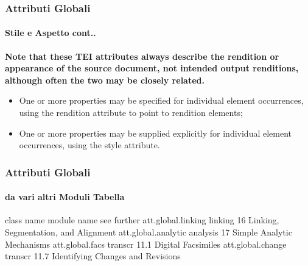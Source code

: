 \begin{frame}
    \frametitle{Attributi Globali}
    \framesubtitle{Stile e Aspetto cont..}
    \addtocounter{nframe}{1}
    
    \textbf{Note that these TEI attributes always describe the rendition or appearance of the source document, not intended output renditions, although often the two may be closely related.}

    \begin{itemize}
        \item One or more properties may be specified for individual element occurrences, using the rendition attribute to point to rendition elements;
        \item One or more properties may be supplied explicitly for individual element occurrences, using the style attribute.
    \end{itemize}

\end{frame}



\begin{frame}
    \frametitle{Attributi Globali}
    \framesubtitle{da vari altri Moduli Tabella}
    \addtocounter{nframe}{1}
class name	module name	see further
att.global.linking	linking	16 Linking, Segmentation, and Alignment
att.global.analytic	analysis	17 Simple Analytic Mechanisms
att.global.facs	transcr	11.1 Digital Facsimiles
att.global.change	transcr	11.7 Identifying Changes and Revisions

\end{frame}

